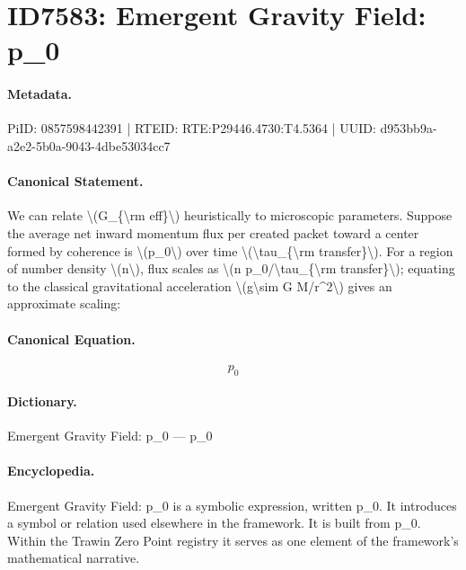 \section*{ID7583: Emergent Gravity Field: p\_0}
\paragraph{Metadata.}
PiID: 0857598442391 | RTEID: RTE:P29446.4730:T4.5364 | UUID: d953bb9a-a2e2-5b0a-9043-4dbe53034cc7

\paragraph{Canonical Statement.}
We can relate \textbackslash{}(G\_\{\textbackslash{}rm eff\}\textbackslash{}) heuristically to microscopic parameters. Suppose the average net inward momentum flux per created packet toward a center formed by coherence is \textbackslash{}(p\_0\textbackslash{}) over time \textbackslash{}(\textbackslash{}tau\_\{\textbackslash{}rm transfer\}\textbackslash{}). For a region of number density \textbackslash{}(n\textbackslash{}), flux scales as \textbackslash{}(n p\_0/\textbackslash{}tau\_\{\textbackslash{}rm transfer\}\textbackslash{}); equating to the classical gravitational acceleration \textbackslash{}(g\textbackslash{}sim G M/r\textasciicircum{}2\textbackslash{}) gives an approximate scaling:

\paragraph{Canonical Equation.}
\[
p_0
\]

\paragraph{Dictionary.}
Emergent Gravity Field: p\_0 — p\_0

\paragraph{Encyclopedia.}
Emergent Gravity Field: p\_0 is a symbolic expression, written p\_0. It introduces a symbol or relation used elsewhere in the framework. It is built from p\_0. Within the Trawin Zero Point registry it serves as one element of the framework's mathematical narrative.
